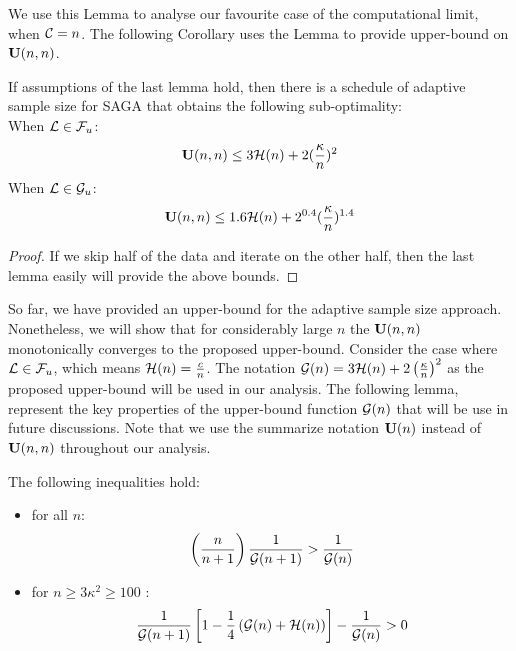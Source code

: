 We use this Lemma to analyse our favourite case of the computational limit, when
${\cal C} = n$. The following Corollary uses the Lemma to provide upper-bound on
$\mathbf U(n,n)$. 
\begin{corollary} \label{cor:onepass_bound}
	If assumptions of the last lemma hold, then there is a schedule of adaptive
	sample size for SAGA that obtains the following sub-optimality: \\ 
	When ${\cal L} \in {\cal F}_{u}$:  
	\begin{equation*}
		\mathbf U(n,n) \leq 3 {\cal H}(n) + 2 (\frac{\kappa}{ n})^2
	\end{equation*}
	When ${\cal L} \in {\cal G}_{u}$: 
	\begin{equation*}
		\mathbf U(n,n) \leq 1.6 {\cal H}(n) + 2^{0.4} (\frac{\kappa}{n})^{1.4}
	\end{equation*}
\end{corollary}	
\begin{proof}
	If we skip half of the data and iterate on the other half, then the
	last lemma easily will provide the above bounds. 
\end{proof}
So far, we have provided an upper-bound for the adaptive sample size approach.
Nonetheless, we will show that for considerably large $n$ the
$\mathbf U(n,n)$ monotonically converges to the proposed upper-bound. Consider the case
where ${\cal L} \in {\cal F}_{u}$, which means ${\cal H}(n) = \frac{c}{n}$. The notation
${\cal G}(n) = 3 {\cal H}(n) + 2 \left(\frac{\kappa}{n}\right)^2$ as the proposed upper-bound will be used in our analysis. The following lemma, represent the key
properties of the upper-bound function ${\cal G}(n)$ that will be use in future
discussions. Note that we use the summarize notation $\mathbf U(n)$ instead of
$\mathbf U(n,n)$ throughout our analysis.
\begin{lemma} \label{lemma:gn_ineq}
	The following inequalities hold: 
	\begin{itemize}
	  \item for all $n$:
	  \begin{equation*}
		\left( \frac{n}{n+1}\right) \frac{1}{{\cal G}(n+1)}  > 
	\frac{1}{{\cal G}(n)}
	\end{equation*}
	\item for $n \geq 3 \kappa^2 \geq 100$ :
	\begin{equation*}
		\frac{1}{{\cal G}(n+1)}
	\left[1 - \frac{1	}{4} \left( {\cal G}(n) + {\cal H}(n)\right)  \right] - 
	\frac{1}{{\cal G}(n)} > 0
	\end{equation*}
	\end{itemize}
	
\end{lemma}

